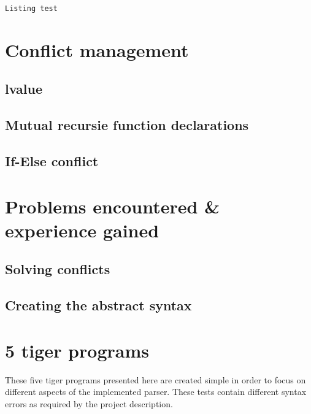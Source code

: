\documentclass{article}
\begin{document}
\begin{lstlisting}[frame=single]
Listing test
\end{lstlisting}

\section{Conflict management}

\subsection{lvalue}

\subsection{Mutual recursie function declarations}

\subsection{If-Else conflict}

\section{Problems encountered \& experience gained}
\subsection{Solving conflicts}

\subsection{Creating the abstract syntax}


\section{5 tiger programs}


These five tiger programs presented here are created simple in order to focus on different aspects of the implemented parser. These tests contain different syntax errors as required by the project description. 
\end{document}
